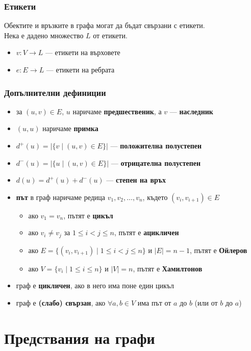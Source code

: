 \documentclass{beamer}
\begin{document}
\begin{frame}
  \frametitle{Етикети}
  Обектите и връзките в графа могат да бъдат свързани с етикети.\\[1em]
  \pause
  Нека е дадено множество $L$ от етикети.
  \begin{itemize}
  \item $v : V \rightarrow L$ --- етикети на върховете
  \item $e : E \rightarrow L$ --- етикети на ребрата
  \end{itemize}
\end{frame}

\begin{frame}
  \frametitle{Допълнителни дефиниции}
  \begin{itemize}[<+->]
  \item за $(u, v)\in E$, $u$ наричаме \textbf{предшественик}, а $v$ --- \textbf{наследник}
  \item $(u, u)$ наричаме \textbf{примка}
  \item $d^+(u) = |\{ v\;|\;(u, v) \in E\}|$ --- \textbf{положителна полустепен}
  \item $d^-(u) = |\{ u\;|\;(u, v) \in E\}|$ --- \textbf{отрицателна полустепен}
  \item $d(u) = d^+(u) + d^-(u)$ --- \textbf{степен на връх}
  \item \textbf{път} в граф наричаме редица $v_1, v_2, \ldots, v_n$, където $(v_i, v_{i+1}) \in E$
    \begin{itemize}
    \item ако $v_1 = v_n$, пътят е \textbf{цикъл}
    \item ако $v_i \neq v_j$ за $1 \leq i < j \leq n$, пътят е \textbf{ацикличен}
    \item ако $E = \{(v_i,v_{i+1})\;|\;1 \leq i < j \leq n\}$ и $|E| = n - 1$, пътят е \textbf{Ойлеров}
    \item ако $V = \{v_i\;|\;1 \leq i \leq n\}$ и $|V| = n$, пътят е \textbf{Хамилтонов}
    \end{itemize}
  \item граф е \textbf{цикличен}, ако в него има поне един цикъл
  \item граф е \textbf{(слабо) свързан}, ако $\forall a, b\in V$ има път от $a$ до $b$ (или от $b$ до $a$)
  \end{itemize}
\end{frame}

\section{Предствания на графи}
\end{document}
